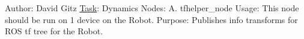 Author\+: David Gitz \hyperlink{structTask}{Task}\+: Dynamics Nodes\+: A. tfhelper\+\_\+node Usage\+: This node should be run on 1 device on the Robot. Purpose\+: Publishes info transforms for R\+OS tf tree for the Robot. 